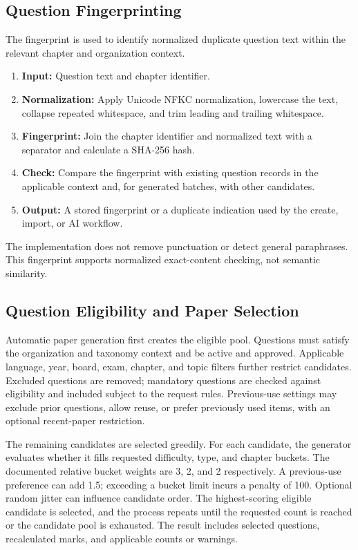 \subsection{Question Fingerprinting}

The fingerprint is used to identify normalized duplicate question text within the relevant chapter and organization context.

\begin{enumerate}
    \item \textbf{Input:} Question text and chapter identifier.
    \item \textbf{Normalization:} Apply Unicode NFKC normalization, lowercase the text, collapse repeated whitespace, and trim leading and trailing whitespace.
    \item \textbf{Fingerprint:} Join the chapter identifier and normalized text with a separator and calculate a SHA-256 hash.
    \item \textbf{Check:} Compare the fingerprint with existing question records in the applicable context and, for generated batches, with other candidates.
    \item \textbf{Output:} A stored fingerprint or a duplicate indication used by the create, import, or AI workflow.
\end{enumerate}

The implementation does not remove punctuation or detect general paraphrases. This fingerprint supports normalized exact-content checking, not semantic similarity.

\subsection{Question Eligibility and Paper Selection}

Automatic paper generation first creates the eligible pool. Questions must satisfy the organization and taxonomy context and be active and approved. Applicable language, year, board, exam, chapter, and topic filters further restrict candidates. Excluded questions are removed; mandatory questions are checked against eligibility and included subject to the request rules. Previous-use settings may exclude prior questions, allow reuse, or prefer previously used items, with an optional recent-paper restriction.

The remaining candidates are selected greedily. For each candidate, the generator evaluates whether it fills requested difficulty, type, and chapter buckets. The documented relative bucket weights are 3, 2, and 2 respectively. A previous-use preference can add 1.5; exceeding a bucket limit incurs a penalty of 100. Optional random jitter can influence candidate order. The highest-scoring eligible candidate is selected, and the process repeats until the requested count is reached or the candidate pool is exhausted. The result includes selected questions, recalculated marks, and applicable counts or warnings.

